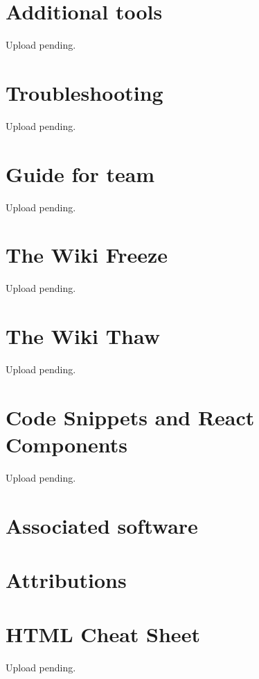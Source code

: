 \documentclass[a4paper, 11pt, twoside]{book}
\begin{document}
\chapter{Additional tools} \label{ch:addtools}
Upload pending.
%
\newpage
%
\chapter{Troubleshooting} \label{ch:troubleshooting}
Upload pending.
%
\newpage
%
\chapter{Guide for team} \label{ch:guide}
Upload pending.
%
\newpage
%
\chapter{The Wiki Freeze}  \label{ch:freeze}
Upload pending.
%
\newpage
%
\chapter{The Wiki Thaw} \label{ch:thaw}
Upload pending.
%
\newpage
%
\chapter{Code Snippets and React Components} \label{ch:appendix}
Upload pending.
%
\newpage

\backmatter
{}
\pagecolor{pgcolor}

\chapter{Associated software} \label{ch:associated-software}


\chapter{Attributions} \label{ch:attributions}

%
\chapter{HTML Cheat Sheet} \label{ch:htmlcheatsheet}
Upload pending.
%
\newpage
\end{document}
